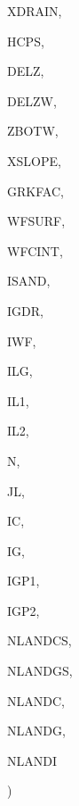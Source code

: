 {\begin{DoxyParamCaption}
\item[{real, dimension(ilg)}]{X\+D\+R\+A\+I\+N, }
\item[{real, dimension  (ilg,ig)}]{H\+C\+P\+S, }
\item[{real, dimension  (ig)}]{D\+E\+L\+Z, }
\item[{real, dimension (ilg,ig)}]{D\+E\+L\+Z\+W, }
\item[{real, dimension (ilg,ig)}]{Z\+B\+O\+T\+W, }
\item[{real, dimension(ilg)}]{X\+S\+L\+O\+P\+E, }
\item[{real, dimension(ilg)}]{G\+R\+K\+F\+A\+C, }
\item[{real, dimension(ilg)}]{W\+F\+S\+U\+R\+F, }
\item[{real, dimension(ilg)}]{W\+F\+C\+I\+N\+T, }
\item[{integer, dimension(ilg,ig)}]{I\+S\+A\+N\+D, }
\item[{integer, dimension  (ilg)}]{I\+G\+D\+R, }
\item[{integer}]{I\+W\+F, }
\item[{integer}]{I\+L\+G, }
\item[{integer}]{I\+L1, }
\item[{integer}]{I\+L2, }
\item[{integer}]{N, }
\item[{integer}]{J\+L, }
\item[{integer}]{I\+C, }
\item[{integer}]{I\+G, }
\item[{integer}]{I\+G\+P1, }
\item[{integer}]{I\+G\+P2, }
\item[{integer}]{N\+L\+A\+N\+D\+C\+S, }
\item[{integer}]{N\+L\+A\+N\+D\+G\+S, }
\item[{integer}]{N\+L\+A\+N\+D\+C, }
\item[{integer}]{N\+L\+A\+N\+D\+G, }
\item[{integer}]{N\+L\+A\+N\+D\+I}
\end{DoxyParamCaption}
)}\label{CLASSW_8f_aac1827011ed2ca61bd0274e83d1f80ad}

